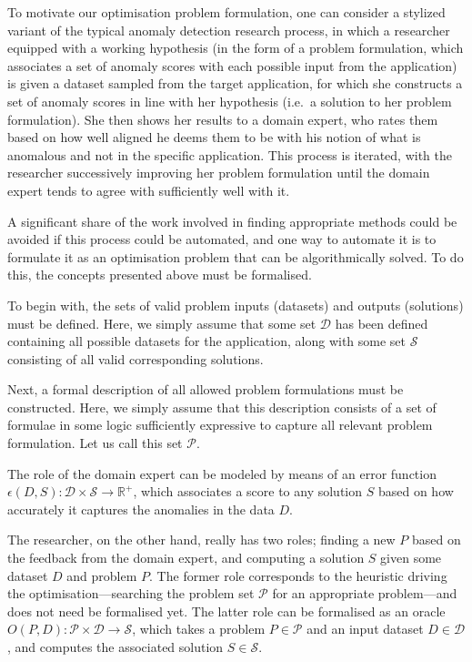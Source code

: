 To motivate our optimisation problem formulation, one can consider a stylized variant of the typical anomaly detection research process, in which a researcher equipped with a working hypothesis (in the form of a problem formulation, which associates a set of anomaly scores with each possible input from the application) is given a dataset sampled from the target application, for which she constructs a set of anomaly scores in line with her hypothesis (i.e.\ a solution to her problem formulation). She then shows her results to a domain expert, who rates them based on how well aligned he deems them to be with his notion of what is anomalous and not in the specific application. This process is iterated, with the researcher successively improving her problem formulation until the domain expert tends to agree with sufficiently well with it.

A significant share of the work involved in finding appropriate methods could be avoided if this process could be automated, and one way to automate it is to formulate it as an optimisation problem that can be algorithmically solved. To do this, the concepts presented above must be formalised.

To begin with, the sets of valid problem inputs (datasets) and outputs (solutions) must be defined. Here, we simply assume that some set $\mathcal{D}$ has been defined containing all possible datasets for the application, along with some set $\mathcal{S}$ consisting of all valid corresponding solutions.

Next, a formal description of all allowed problem formulations must be constructed. Here, we simply assume that this description consists of a set of formulae in some logic sufficiently expressive to capture all relevant problem formulation. Let us call this set $\mathcal{P}$.

The role of the domain expert can be modeled by means of an error function $\epsilon(D, S): \mathcal{D} \times \mathcal{S} \rightarrow \mathbb{R}^+$, which associates a score to any solution $S$ based on how accurately it captures the anomalies in the data $D$.

The researcher, on the other hand, really has two roles; finding a new $P$ based on the feedback from the domain expert, and computing a solution $S$ given some dataset $D$ and problem $P$. The former role corresponds to the heuristic driving the optimisation---searching the problem set $\mathcal{P}$ for an appropriate problem---and does not need be formalised yet. The latter role can be formalised as an oracle $O(P, D): \mathcal{P} \times \mathcal{D} \rightarrow \mathcal{S}$, which takes a problem $P \in \mathcal{P}$ and an input dataset $D \in \mathcal{D}$, and computes the associated solution $S \in \mathcal{S}$.

